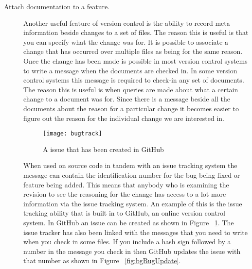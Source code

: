 \begin{description}

  \item [Attach documentation to a feature.]
  Another useful feature of version control is the ability to record meta information beside changes to a set of files.  The reason this is useful is that you can specify what the change was for.  It is possible to associate a change that has occurred over multiple files as being for the same reason.  Once the change has been made is possible in most version control systems to write a message when the documents are checked in.  In some version control systems this message is required to check-in any set of documents.  The reason this is useful is when queries are made about what a certain change to a document was for.  Since there is a message beside all the documents about the reason for a particular change it becomes easier to figure out the reason for the individual change we are interested in. 

  \begin{figure}[!t]
   \begin{center}
    \texttt{[image: bugtrack]}
   \end{center}
   \caption{A issue that has been created in GitHub}
   \label{fig:bgBugTrack}
  \end{figure}

  When used on source code in tandem with an issue tracking system the message can contain the identification number for the bug being fixed or feature being added.  This means that anybody who is examining the revision to see the reasoning for the change has access to a lot more information via the issue tracking system. An example of this is the issue tracking ability that is built in to GitHub, an online version control system. In GitHub an issue can be created as shown in Figure ~\ref{fig:bgBugTrack}. The issue tracker has also been linked with the messages that you need to write when you check in some files. If you include a hash sign followed by a number in the message you check in then GitHub updates the issue with that number as shown in Figure ~\ref{fig:bgBugUpdate}.


\end{description}
